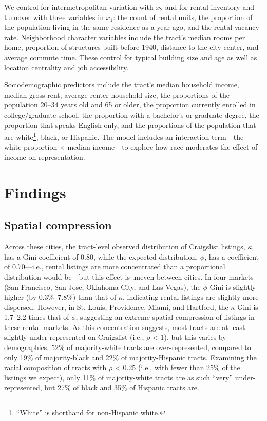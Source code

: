 \documentclass[11pt,onecolumn]{article} %
\begin{document}
We control for intermetropolitan variation with $x_2$ and for rental inventory and turnover with three variables in $x_1$: the count of rental units, the proportion of the population living in the same residence as a year ago, and the rental vacancy rate. Neighborhood character variables include the tract's median rooms per home, proportion of structures built before 1940, distance to the city center, and average commute time. These control for typical building size and age as well as location centrality and job accessibility.

Sociodemographic predictors include the tract's median household income, median gross rent, average renter household size, the proportions of the population 20--34 years old and 65 or older, the proportion currently enrolled in college/graduate school, the proportion with a bachelor's or graduate degree, the proportion that speaks English-only, and the proportions of the population that are white\footnote{\enquote{White} is shorthand for non-Hispanic white.}, black, or Hispanic. The model includes an interaction term---the white proportion $\times$ median income---to explore how race moderates the effect of income on representation.




\section{Findings}

\subsection{Spatial compression}

Across these cities, the tract-level observed distribution of Craigslist listings, $\kappa$, has a Gini coefficient of 0.80, while the expected distribution, $\phi$, has a coefficient of 0.70---i.e., rental listings are more concentrated than a proportional distribution would be---but this effect is uneven between cities. In four markets (San Francisco, San Jose, Oklahoma City, and Las Vegas), the $\phi$ Gini is slightly higher (by 0.3\%--7.8\%) than that of $\kappa$, indicating rental listings are slightly more dispersed. However, in St. Louis, Providence, Miami, and Hartford, the $\kappa$ Gini is 1.7--2.2 times that of $\phi$, suggesting an extreme spatial compression of listings in these rental markets. As this concentration suggests, most tracts are at least slightly under-represented on Craigslist (i.e., $\rho$ < 1), but this varies by demographics. 52\% of majority-white tracts are over-represented, compared to only 19\% of majority-black and 22\% of majority-Hispanic tracts. Examining the racial composition of tracts with $\rho$ < 0.25 (i.e., with fewer than 25\% of the listings we expect), only 11\% of majority-white tracts are as such \enquote{very} under-represented, but 27\% of black and 35\% of Hispanic tracts are.
\end{document}
